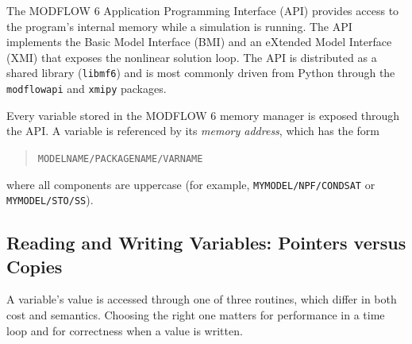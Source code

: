
The MODFLOW 6 Application Programming Interface (API) provides access to the
program's internal memory while a simulation is running. The API implements the
Basic Model Interface (BMI) and an eXtended Model Interface (XMI) that exposes
the nonlinear solution loop. The API is distributed
as a shared library (\texttt{libmf6}) and is most commonly driven from Python
through the \texttt{modflowapi} and \texttt{xmipy} packages.

Every variable stored in the MODFLOW 6 memory manager is exposed through the
API. A variable is referenced by its \emph{memory address}, which has the form

\begin{quote}
\texttt{MODELNAME/PACKAGENAME/VARNAME}
\end{quote}

\noindent where all components are uppercase (for example,
\texttt{MYMODEL/NPF/CONDSAT} or \texttt{MYMODEL/STO/SS}).

\subsection{Reading and Writing Variables: Pointers versus Copies}

A variable's value is accessed through one of three routines, which differ in
both cost and semantics. Choosing the right one matters for performance in a
time loop and for correctness when a value is written.

